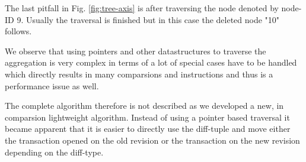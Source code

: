 
%

The last pitfall in Fig. \ref{fig:tree-axis} is after traversing the node denoted by node-ID 9. Usually the traversal is finished but in this case the deleted node "10" follows.

We observe that using pointers and other datastructures to traverse the aggregation is very complex in terms of a lot of special cases have to be handled which directly results in many comparsions and instructions and thus is a performance issue as well.

The complete algorithm therefore is not described as we developed a new, in comparsion lightweight algorithm. Instead of using a pointer based traversal it became apparent that it is easier to directly use the diff-tuple and move either the transaction opened on the old revision or the transaction on the new revision depending on the diff-type.

